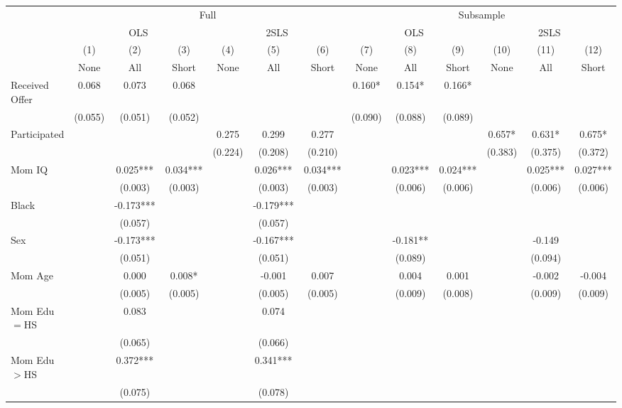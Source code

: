 \begin{tabular}{lcccccccccccc}
\toprule 
\midrule 
 & \multicolumn{6}{c}{Full} & \multicolumn{6}{c}{Subsample} \\
 \cmidrule(lr){2-7} \cmidrule(lr){8-13} 
 & \multicolumn{3}{c}{OLS} & \multicolumn{3}{c}{2SLS} & \multicolumn{3}{c}{OLS} & \multicolumn{3}{c}{2SLS} \\
 \cmidrule(lr){2-4} \cmidrule(lr){5-7} \cmidrule(lr){8-10} \cmidrule(lr){11-13} 
 & (1) & (2) & (3) & (4) & (5) & (6) & (7) & (8) & (9) & (10) & (11) & (12) \\
 & None & All & Short & None & All & Short & None & All & Short & None & All & Short \\
\midrule 
Received Offer & 0.068 & 0.073 & 0.068 &  &  &  & 0.160* & 0.154* & 0.166* &  &  &  \\
 & (0.055) & (0.051) & (0.052) &  &  &  & (0.090) & (0.088) & (0.089) &  &  &  \\
Participated &  &  &  & 0.275 & 0.299 & 0.277 &  &  &  & 0.657* & 0.631* & 0.675* \\
 &  &  &  & (0.224) & (0.208) & (0.210) &  &  &  & (0.383) & (0.375) & (0.372) \\
Mom IQ &  & 0.025*** & 0.034*** &  & 0.026*** & 0.034*** &  & 0.023*** & 0.024*** &  & 0.025*** & 0.027*** \\
 &  & (0.003) & (0.003) &  & (0.003) & (0.003) &  & (0.006) & (0.006) &  & (0.006) & (0.006) \\
Black &  & -0.173*** &  &  & -0.179*** &  &  &  &  &  &  &  \\
 &  & (0.057) &  &  & (0.057) &  &  &  &  &  &  &  \\
Sex &  & -0.173*** &  &  & -0.167*** &  &  & -0.181** &  &  & -0.149 &  \\
 &  & (0.051) &  &  & (0.051) &  &  & (0.089) &  &  & (0.094) &  \\
Mom Age &  & 0.000 & 0.008* &  & -0.001 & 0.007 &  & 0.004 & 0.001 &  & -0.002 & -0.004 \\
 &  & (0.005) & (0.005) &  & (0.005) & (0.005) &  & (0.009) & (0.008) &  & (0.009) & (0.009) \\
Mom Edu$=$HS &  & 0.083 &  &  & 0.074 &  &  &  &  &  &  &  \\
 &  & (0.065) &  &  & (0.066) &  &  &  &  &  &  &  \\
Mom Edu$>$HS &  & 0.372*** &  &  & 0.341*** &  &  &  &  &  &  &  \\
 &  & (0.075) &  &  & (0.078) &  &  &  &  &  &  &  \\

\end{tabular}
